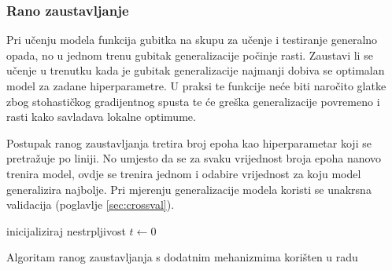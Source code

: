 \documentclass[times, utf8, numeric, diplomski]{fer}
\def\secref#1{(poglavlje \ref{#1})}
\begin{document}
\subsubsection{Rano zaustavljanje}
Pri učenju modela funkcija gubitka na skupu za učenje i testiranje generalno opada, no u jednom trenu gubitak generalizacije počinje rasti. Zaustavi li se učenje u trenutku kada je gubitak generalizacije najmanji dobiva se optimalan model za zadane hiperparametre. U praksi te funkcije neće biti naročito glatke zbog stohastičkog gradijentnog spusta te će greška generalizacije povremeno i rasti kako savladava lokalne optimume.

Postupak ranog zaustavljanja tretira broj epoha kao hiperparametar koji se pretražuje po liniji. No umjesto da se za svaku vrijednost broja epoha nanovo trenira model, ovdje se trenira jednom i odabire vrijednost za koju model generalizira najbolje. Pri mjerenju generalizacije modela koristi se unakrsna validacija \secref{sec:crossval}.

\begin{algorithm}[H]
\begin{algorithmic}
inicijaliziraj nestrpljivost $t \gets 0$ \\
  \ENDWHILE
{}
\end{algorithmic}
\caption{Algoritam ranog zaustavljanja s dodatnim mehanizmima korišten u radu}
\label{alg:early_stop}
\end{algorithm}
\end{document}
